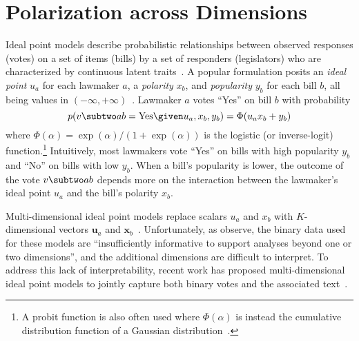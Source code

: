\section{Polarization across Dimensions}
\label{subsec:c6_idealpoint_overview}


Ideal point models describe probabilistic
relationships between observed responses (votes) on a set of items (bills) by a set of
responders (legislators) who are characterized by continuous latent
traits~\cite{Fox:Book10}.  A popular formulation posits an
\textit{ideal point} $u_a$ for each lawmaker $a$, a \textit{polarity}
$x_b$, and \textit{popularity} $y_b$ for each bill $b$, all being
values in
$(-\infty,+\infty)$~\cite{Martin:PA02,Bafumi:PA05,Gerrish:ICML11}. Lawmaker
$a$ votes ``Yes'' on bill $b$ with probability
\begin{equation}
  p(v \subtwo ab = \mbox{Yes} \given u_a, x_b, y_b) = \Phi(u_a x_b + y_b)
  \label{eqn:c6_onedim}
\end{equation}
where $\Phi(\alpha) = \exp(\alpha) / (1 + \exp(\alpha))$ is the
logistic (or inverse-logit) function.\footnote{A probit function is
  also often used where $\Phi(\alpha)$ is instead the cumulative
  distribution function of a Gaussian
  distribution~\cite{Martin:PA02}.} Intuitively, most lawmakers
vote ``Yes'' on bills with high popularity $y_b$ and ``No'' on bills
with low $y_b$. When a bill's popularity is lower, the outcome of
the vote $v \subtwo ab$ depends more on the interaction between the lawmaker's ideal
point $u_a$ and the bill's polarity $x_b$.

Multi-dimensional ideal point models replace scalars $u_a$ and $x_b$
with $K$-dimensional vectors $\bm u_a$ and $\bm
x_b$~\cite{Heckman:NBER96,Jackman:PA01,Clinton:APSR04}.
Unfortunately, as  observe, the binary data
used for these models are ``insufficiently informative to support
analyses beyond one or two dimensions'', and the additional dimensions
are difficult to interpret.  To address this lack of interpretability, recent work has proposed multi-dimensional ideal point models to jointly capture both binary votes and the associated text~\cite{Gerrish:NIPS12,Gu:KDD14,Lauderdale:AJPS14,Sim:AAAI15:utility}.

